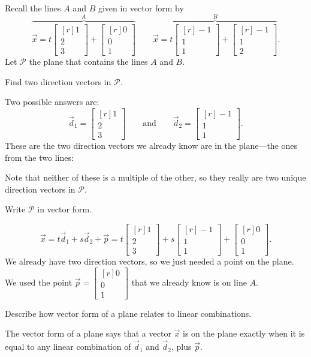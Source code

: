 \documentclass{problemset}
\newcommand{\mat}[1]{\begin{bmatrix*}[r]#1\end{bmatrix*}}
\begin{document}
	\question
	Recall the lines $A$ and $B$ given in vector form by
	\[
		\overbrace{\vec x=t\mat{1\\2\\3}+\mat{0\\0\\1}}^{\displaystyle A}
		\qquad
		\overbrace{\vec x=t\mat{-1\\1\\1}+\mat{-1\\1\\2}}^{\displaystyle B}.
	\]
	Let $\mathcal P$ the plane that contains the lines $A$ and $B$.
	\begin{parts}
		\item Find two direction vectors in $\mathcal P$.
			\begin{solution}
				Two possible answers are:
				\[
					\vec d_1 = \mat{1\\2\\3}
					\qquad \text{and} \qquad
					\vec d_2 = \mat{-1\\1\\1}.
				\]
				These are the two direction vectors we already know are in the 
				plane---the ones from the two lines:
				
				Note that neither of these is a multiple of the other, so they 
				really are two unique direction vectors in $\mathcal P$.
			\end{solution}
		\item Write $\mathcal P$ in vector form.
			\begin{solution}
				\[
					\vec x = t\vec d_1 +s\vec d_2+\vec p
					= t \mat{1\\2\\3} + s \mat{-1\\1\\1} + \mat{0\\0\\1}.
				\]
				We already have two direction vectors, so we just needed a point
				on the plane. We used the point $\vec p = \mat{0\\0\\1}$ 
				that we already know is on line $A$. 
			\end{solution}
		\item Describe how vector form of a plane relates to linear
			combinations.
			\begin{solution}
				The vector form of a plane says that a vector $\vec x$ is on the
				plane exactly when it is equal to any linear combination of 
				$\vec d_1$ and $\vec d_2$, plus $\vec p$. 


\end{solution}
\end{parts}
\end{document}
